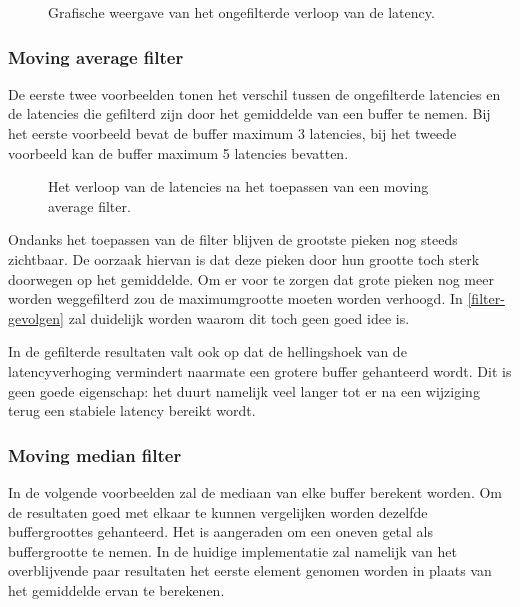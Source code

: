 

\begin{figure}[h!]
	\captionsetup{width=0.7\textwidth}
	\caption[Het ongefilterde verloop van de latency]{Grafische weergave van het ongefilterde verloop van de latency.}
	\begin{center}
		\advance\parskip0.3cm
	\end{center}
	\label{latencydata}
\end{figure}

\subsubsection{Moving average filter}

De eerste twee voorbeelden tonen het verschil tussen de ongefilterde latencies en de latencies die gefilterd zijn door het gemiddelde van een buffer te nemen. Bij het eerste voorbeeld bevat de buffer maximum 3 latencies, bij het tweede voorbeeld kan de buffer maximum 5 latencies bevatten.

\begin{figure}[!tbph]
	\centering
	\hfill
	\captionsetup{width=0.7\textwidth}
	\caption{Het verloop van de latencies na het toepassen van een moving average filter.}
\end{figure}

Ondanks het toepassen van de filter blijven de grootste pieken nog steeds zichtbaar. De oorzaak hiervan is dat deze pieken door hun grootte toch sterk doorwegen op het gemiddelde. Om er voor te zorgen dat grote pieken nog meer worden weggefilterd zou de maximumgrootte moeten worden verhoogd. In \ref{filter-gevolgen} zal duidelijk worden waarom dit toch geen goed idee is.

In de gefilterde resultaten valt ook op dat de hellingshoek van de latencyverhoging vermindert naarmate een grotere buffer gehanteerd wordt. Dit is geen goede eigenschap: het duurt namelijk veel langer tot er na een wijziging terug een stabiele latency bereikt wordt.

\subsubsection{Moving median filter}

In de volgende voorbeelden zal de mediaan van elke buffer berekent worden. Om de resultaten goed met elkaar te kunnen vergelijken worden dezelfde buffergroottes gehanteerd. Het is aangeraden om een oneven getal als buffergrootte te nemen. In de huidige implementatie zal namelijk van het overblijvende paar resultaten het eerste element genomen worden in plaats van het gemiddelde ervan te berekenen.

